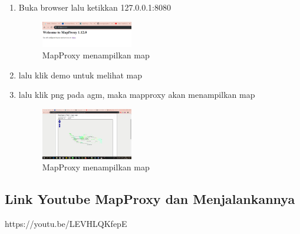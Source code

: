 \begin{enumerate}
  \item Buka browser lalu ketikkan 127.0.0.1:8080
  \hfill\break
  \begin{figure}[H]
  \includegraphics[width=4cm]{figures/tugas4/1174070/24.png}
  \centering
  \caption{MapProxy menampilkan map}
  \end{figure}

  \item lalu klik demo untuk melihat map
  \item lalu klik png pada agm, maka mapproxy akan menampilkan map
  \hfill\break
  \begin{figure}[H]
  \includegraphics[width=4cm]{figures/tugas4/1174070/25.png}
  \centering
  \caption{MapProxy menampilkan map}
  \end{figure}

\end{enumerate}

\subsection{Link Youtube MapProxy dan Menjalankannya}
https://youtu.be/LEVHLQKfepE